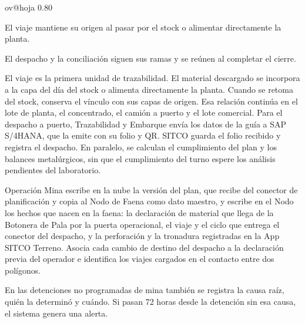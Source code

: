 \documentclass[subdoc]{../../comun/overfore}
\begin{document}
\begin{horizontal}
\csname ov@hoja\endcsname{330.2mm}{215.9mm}
\expandafter\def\csname ov@altofig\endcsname{0.80}

\clearpage
\addtocounter{figure}{-1}
\begingroup
\def\thefigure{4.10a}
\def\theHfigure{4.10a}
\endgroup
El viaje mantiene su origen al pasar por el stock o alimentar directamente la planta.

\clearpage
\addtocounter{figure}{-1}
\begingroup
\def\thefigure{4.10b}
\def\theHfigure{4.10b}
\endgroup
El despacho y la conciliación siguen sus ramas y se reúnen al completar el cierre.
\end{horizontal}
El viaje es la primera unidad de trazabilidad. El material descargado se incorpora a la capa del día del stock o alimenta directamente la planta. Cuando se retoma del stock, conserva el vínculo con sus capas de origen. Esa relación continúa en el lote de planta, el concentrado, el camión a puerto y el lote comercial. Para el despacho a puerto, Trazabilidad y Embarque envía los datos de la guía a SAP S/4HANA, que la emite con su folio y QR. SITCO guarda el folio recibido y registra el despacho. En paralelo, se calculan el cumplimiento del plan y los balances metalúrgicos, sin que el cumplimiento del turno espere los análisis pendientes del laboratorio.

Operación Mina escribe en la nube la versión del plan, que recibe del conector de planificación y copia al Nodo de Faena como dato maestro, y escribe en el Nodo los hechos que nacen en la faena: la declaración de material que llega de la Botonera de Pala por la puerta operacional, el viaje y el ciclo que entrega el conector del despacho, y la perforación y la tronadura registradas en la App SITCO Terreno. Asocia cada cambio de destino del despacho a la declaración previa del operador e identifica los viajes cargados en el contacto entre dos polígonos.

En las detenciones no programadas de mina también se registra la causa raíz, quién la determinó y cuándo. Si pasan 72 horas desde la detención sin esa causa, el sistema genera una alerta.
\end{document}
